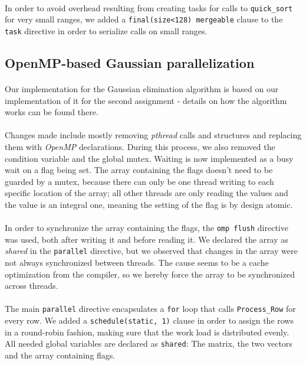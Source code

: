 \documentclass[]{article}
\begin{document}
\paragraph{} In order to avoid overhead resulting from creating tasks for calls to \texttt{quick\_sort} for very small ranges, we added a \texttt{final(size<128) mergeable} clause to the \texttt{task} directive in order to serialize calls on small ranges.

\subsection{OpenMP-based Gaussian parallelization}

\paragraph{} Our implementation for the Gaussian elimination algorithm is based on our implementation of it for the second assignment - details on how the algorithm works can be found there.

\paragraph{} Changes made include mostly removing \textit{pthread} calls and structures and replacing them with \textit{OpenMP} declarations. During this process, we also removed the condition variable and the global mutex. Waiting is now implemented as a busy wait on a flag being set. The array containing the flags doesn't need to be guarded by a mutex, because there can only be one thread writing to each specific location of the array; all other threads are only reading the values and the value is an integral one, meaning the setting of the flag is by design atomic.

\paragraph{} In order to synchronize the array containing the flags, the \texttt{omp flush} directive was used, both after writing it and before reading it. We declared the array as \textit{shared} in the \texttt{parallel} directive, but we observed that changes in the array were not always synchronized between threads. The cause seems to be a cache optimization from the compiler, so we hereby force the array to be synchronized across threads.

\paragraph{} The main \texttt{parallel} directive encapsulates a \texttt{for} loop that calls \texttt{Process\_Row} for every row. We added a \texttt{schedule(static, 1)} clause in order to assign the rows in a round-robin fashion, making sure that the work load is distributed evenly. All needed global variables are declared as \texttt{shared}: The matrix, the two vectors and the array containing flags.
\end{document}
